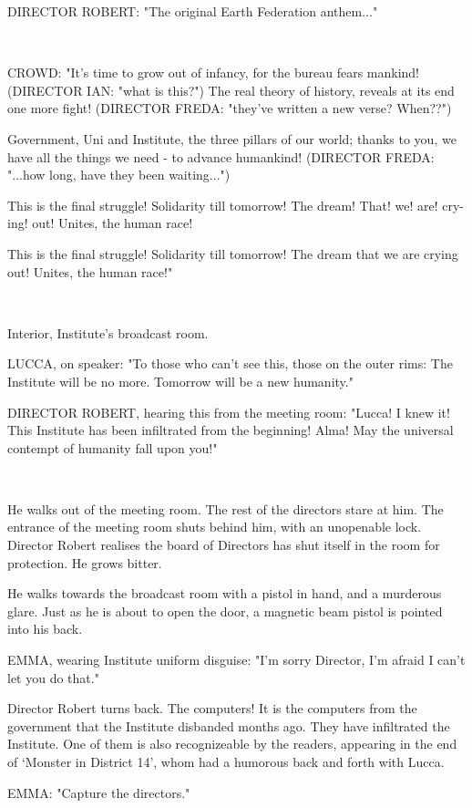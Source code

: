 \documentclass[11pt]{article}
\begin{document}
DIRECTOR ROBERT: "The original Earth Federation anthem..."

\ 

CROWD: "It's time to grow out of infancy,
for the bureau fears mankind! (DIRECTOR IAN: "what is this?")
The real theory of history, 
reveals at its end one more fight! (DIRECTOR FREDA: "they've written a new verse? When??")

Government, Uni and Institute, 
the three pillars of our world;
thanks to you, we have all the things we need - 
to advance humankind! (DIRECTOR FREDA: "...how long, have they been waiting...")

This is the final struggle!
Solidarity till tomorrow!
The dream! That! we! are! cry-ing! out!
Unites, the human race!

This is the final struggle!
Solidarity till tomorrow!
The dream that we are crying out!
Unites, the human race!"

\ 

Interior, Institute's broadcast room.

LUCCA, on speaker: "To those who can't see this, those on the outer rims: 
The Institute will be no more.
Tomorrow will be a new humanity."

DIRECTOR ROBERT, hearing this from the meeting room: "Lucca! 
I knew it! This Institute has been infiltrated from the beginning!
Alma! 
May the universal contempt of humanity fall upon you!"

\ 

He walks out of the meeting room. 
The rest of the directors stare at him.
The entrance of the meeting room shuts behind him, with an unopenable lock. 
Director Robert realises the board of Directors has shut itself in the room for protection. He grows bitter.

He walks towards the broadcast room with a pistol in hand, and a murderous glare. 
Just as he is about to open the door, a magnetic beam pistol is pointed into his back.

EMMA, wearing Institute uniform disguise: "I'm sorry Director, I'm afraid I can't let you do that."

Director Robert turns back. 
The computers!
It is the computers from the government that the Institute disbanded months ago. 
They have infiltrated the Institute. 
One of them is also recognizeable by the readers, appearing in the end of `Monster in District 14', whom had a humorous back and forth with Lucca.

EMMA: "Capture the directors."
\end{document}
